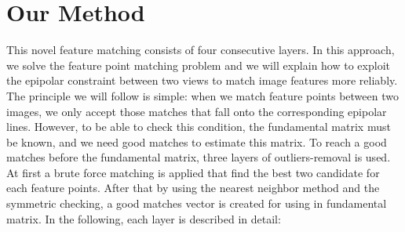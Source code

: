 \section {Our Method} \label{sec:our_method}
This novel feature matching consists of four consecutive layers. In this approach, we solve the feature point matching problem and we will explain how to exploit the epipolar constraint between two views to match image features more reliably.\\
The principle we will follow is simple: when we match feature points between two images, we only accept those matches that fall onto the corresponding epipolar lines. However, to be able to check this condition, the fundamental matrix must be known, and we need good matches to estimate this matrix. To reach a good matches before the fundamental matrix, three layers of outliers-removal is used. At first a brute force matching is applied that find the best two candidate for each feature points. After that by using the nearest neighbor method and the symmetric checking, a good matches vector is created for using in fundamental matrix.
In the following, each layer is described in detail:
